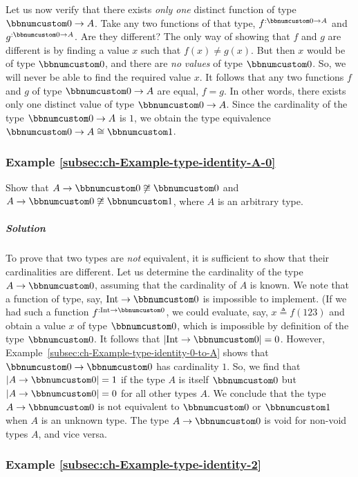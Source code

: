 Let us now verify that there exists \emph{only one} distinct function
of type $\bbnum 0\rightarrow A$. Take any two functions of that type,
$f^{:\bbnum 0\rightarrow A}$ and $g^{:\bbnum 0\rightarrow A}$. Are
they different? The only way of showing that $f$ and $g$ are different
is by finding a value $x$ such that $f(x)\neq g(x)$. But then $x$
would be of type $\bbnum 0$, and there are \emph{no} \emph{values}
of type $\bbnum 0$. So, we will never be able to find the required
value $x$. It follows that any two functions $f$ and $g$ of type
$\bbnum 0\rightarrow A$ are equal, $f=g$. In other words, there
exists only one distinct value of type $\bbnum 0\rightarrow A$. Since
the cardinality of the type $\bbnum 0\rightarrow A$ is $1$, we obtain
the type equivalence $\bbnum 0\rightarrow A\cong\bbnum 1$.

\subsubsection{Example \label{subsec:ch-Example-type-identity-A-0}\ref{subsec:ch-Example-type-identity-A-0}}

Show that $A\rightarrow\bbnum 0\not\cong\bbnum 0$ and $A\rightarrow\bbnum 0\not\cong\bbnum 1$,
where $A$ is an arbitrary type.

\subparagraph{Solution}

To prove that two types are \emph{not} equivalent, it is sufficient
to show that their cardinalities are different. Let us determine the
cardinality of the type $A\rightarrow\bbnum 0$, assuming that the
cardinality of $A$ is known. We note that a function of type, say,
$\text{Int}\rightarrow\bbnum 0$ is impossible to implement. (If we
had such a function $f^{:\text{Int}\rightarrow\bbnum 0}$, we could
evaluate, say, $x\triangleq f(123)$ and obtain a value $x$ of type
$\bbnum 0$, which is impossible by definition of the type $\bbnum 0$.
It follows that $\left|\text{Int}\rightarrow\bbnum 0\right|=0$. However,
Example~\ref{subsec:ch-Example-type-identity-0-to-A} shows that
$\bbnum 0\rightarrow\bbnum 0$ has cardinality $1$. So, we find that
$\left|A\rightarrow\bbnum 0\right|=1$ if the type $A$ is itself
$\bbnum 0$ but $\left|A\rightarrow\bbnum 0\right|=0$ for all other
types $A$. We conclude that the type $A\rightarrow\bbnum 0$ is not
equivalent to $\bbnum 0$ or $\bbnum 1$ when $A$ is an unknown type.
The type $A\rightarrow\bbnum 0$ is void for non-void types $A$,
and vice versa.

\subsubsection{Example \label{subsec:ch-Example-type-identity-2}\ref{subsec:ch-Example-type-identity-2}}

